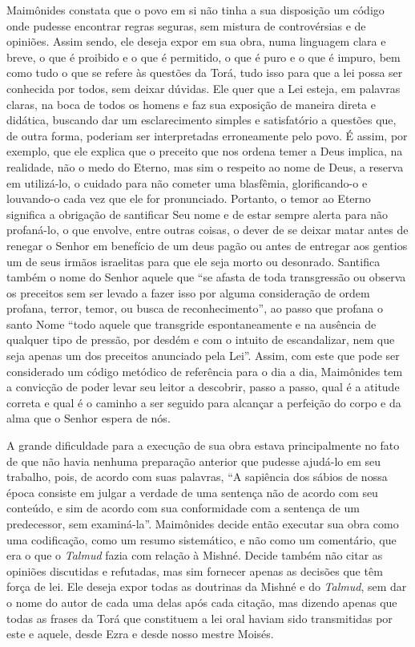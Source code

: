 Maimônides constata que o povo em si não tinha a sua disposição um
código onde pudesse encontrar regras seguras, sem mistura de
controvérsias e de opiniões. Assim sendo, ele deseja expor em sua obra,
numa linguagem clara e breve, o que é proibido e o que é permitido, o
que é puro e o que é impuro, bem como tudo o que se refere às questões
da Torá, tudo isso para que a lei possa ser conhecida por todos,
sem deixar dúvidas. Ele quer que a Lei esteja, em palavras claras, na
boca de todos os homens e faz sua exposição de maneira direta e
didática, buscando dar um esclarecimento simples e satisfatório a
questões que, de outra forma, poderiam ser interpretadas erroneamente
pelo povo. É assim, por exemplo, que ele explica que o preceito que nos
ordena temer a Deus implica, na realidade, não o medo do Eterno, mas
sim o respeito ao nome de Deus, a reserva em utilizá-lo, o cuidado para
não cometer uma blasfêmia, glorificando-o e louvando-o cada vez que ele
for pronunciado. Portanto, o temor ao Eterno significa a obrigação de
santificar Seu nome e de estar sempre alerta para não profaná-lo, o que
envolve, entre outras coisas, o dever de se deixar matar antes de
renegar o Senhor em benefício de um deus pagão ou antes de entregar aos
gentios um de seus irmãos israelitas para que ele seja morto ou
desonrado. Santifica também o nome do Senhor aquele que ``se afasta de
toda transgressão ou observa os preceitos sem ser levado a fazer isso
por alguma consideração de ordem profana, terror, temor, ou busca de
reconhecimento'', ao passo que profana o santo Nome ``todo aquele que
transgride espontaneamente e na ausência de qualquer tipo de pressão,
por desdém e com o intuito de escandalizar, nem que seja apenas um dos
preceitos anunciado pela Lei''. Assim, com este que pode ser considerado
um código metódico de referência para o dia a dia, Maimônides tem a
convicção de poder levar seu leitor a descobrir, passo a passo, qual é a
atitude correta e qual é o caminho a ser seguido para alcançar a
perfeição do corpo e da alma que o Senhor espera de nós.


A grande dificuldade para a execução de sua obra estava principalmente
no fato de que não havia nenhuma preparação anterior que pudesse
ajudá-lo em seu trabalho, pois, de acordo com suas palavras, ``A
sapiência dos sábios de nossa época consiste em julgar a verdade de uma
sentença não de acordo com seu conteúdo, e sim de acordo com sua
conformidade com a sentença de um predecessor, sem examiná-la''.
Maimônides decide então executar sua obra como uma codificação, como um
resumo sistemático, e não como um comentário, que era o que o
\emph{Talmud} fazia com relação à Mishné. Decide também não citar
as opiniões discutidas e refutadas, mas sim fornecer apenas as decisões
que têm força de lei. Ele deseja expor todas as doutrinas da
Mishné e do \emph{Talmud}, sem dar o nome do autor de cada uma
delas após cada citação, mas dizendo apenas que todas as frases da
Torá que constituem a lei oral haviam sido transmitidas por este
e aquele, desde Ezra e desde nosso mestre Moisés.

